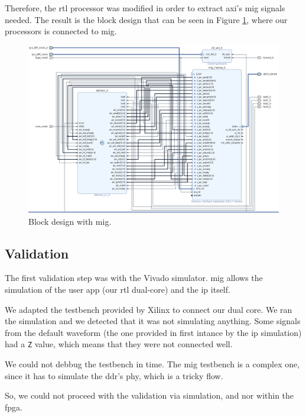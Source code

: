 Therefore, the \gls{rtl} processor was modified in order to extract \gls{axi}'s \gls{mig} signals needed. 
The result is the block design that can be seen in Figure \ref{fig:bd_mig}, where our processors is connected to \gls{mig}.

    \begin{figure}
        \hspace{-3cm}
        \centering
        \includegraphics[width=1.2\textwidth]{images/bd_ddr.png}
        \caption{Block design with \gls{mig}.}
        \label{fig:bd_mig}
    \end{figure}

\subsection{Validation}
The first validation step was with the Vivado simulator. 
\gls{mig} allows the simulation of the user app (our \gls{rtl} dual-core) and the \gls{ip} itself.

We adapted the testbench provided by Xilinx to connect our dual core. 
We ran the simulation and we detected that it was not simulating anything.
Some signals from the default waveform (the one provided in first intance by the \gls{ip} simulation) had a \texttt{Z} value, which means that they were not connected well.

We could not debbug the testbench in time.
The \gls{mig} testbench is a complex one, since it has to simulate the \gls{ddr}'s \gls{phy}, which is a tricky flow.

So, we could not proceed with the validation via simulation, and nor within the \gls{fpga}.

